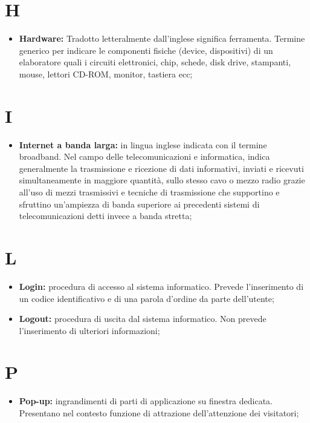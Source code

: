 	\section*{\Huge H} %
		\begin{itemize}
			\item \textbf{Hardware:} Tradotto letteralmente dall'inglese significa ferramenta. Termine generico per indicare le componenti fisiche (device, dispositivi) di un elaboratore quali i circuiti elettronici, chip, schede, disk drive, stampanti, mouse, lettori CD-ROM, monitor, tastiera ecc;
		\end{itemize}

	\section*{\Huge I} %
		\begin{itemize}
			\item \textbf{Internet a banda larga:} in lingua inglese indicata con il termine broadband. Nel campo delle telecomunicazioni e informatica, indica generalmente la trasmissione e ricezione di dati informativi, inviati e ricevuti simultaneamente in maggiore quantità, sullo stesso cavo o mezzo radio grazie all'uso di mezzi trasmissivi e tecniche di trasmissione che supportino e sfruttino un'ampiezza di banda superiore ai precedenti sistemi di telecomunicazioni detti invece a banda stretta;
		\end{itemize}

	\section*{\Huge L} %
		\begin{itemize}
			\item \textbf{Login:} procedura di accesso al sistema informatico. Prevede l'inserimento di un codice identificativo e di una parola d'ordine da parte dell'utente;
			\item \textbf{Logout:} procedura di uscita dal sistema informatico. Non prevede l'inserimento di ulteriori informazioni;
		\end{itemize}

	\section*{\Huge P} %
	\begin{itemize}
			\item \textbf{Pop-up:} ingrandimenti di parti di applicazione su finestra dedicata. Presentano nel contesto funzione di attrazione dell'attenzione dei visitatori;
		\end{itemize}

